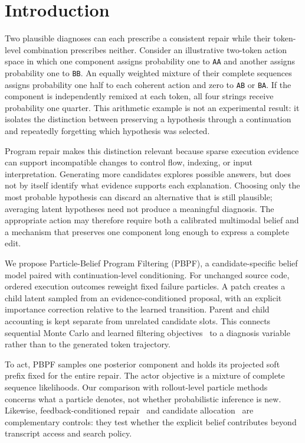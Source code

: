 \section{Introduction}
Two plausible diagnoses can each prescribe a consistent repair while their token-level combination prescribes neither. Consider an illustrative two-token action space in which one component assigns probability one to \texttt{AA} and another assigns probability one to \texttt{BB}. An equally weighted mixture of their complete sequences assigns probability one half to each coherent action and zero to \texttt{AB} or \texttt{BA}. If the component is independently remixed at each token, all four strings receive probability one quarter. This arithmetic example is not an experimental result: it isolates the distinction between preserving a hypothesis through a continuation and repeatedly forgetting which hypothesis was selected.

Program repair makes this distinction relevant because sparse execution evidence can support incompatible changes to control flow, indexing, or input interpretation. Generating more candidates explores possible answers, but does not by itself identify what evidence supports each explanation. Choosing only the most probable hypothesis can discard an alternative that is still plausible; averaging latent hypotheses need not produce a meaningful diagnosis. The appropriate action may therefore require both a calibrated multimodal belief and a mechanism that preserves one component long enough to express a complete edit.

We propose Particle-Belief Program Filtering (PBPF), a candidate-specific belief model paired with continuation-level conditioning. For unchanged source code, ordered execution outcomes reweight fixed failure particles. A patch creates a child latent sampled from an evidence-conditioned proposal, with an explicit importance correction relative to the learned transition. Parent and child accounting is kept separate from unrelated candidate slots. This connects sequential Monte Carlo and learned filtering objectives~\citep{delmoral2006,maddison2017,naesseth2018} to a diagnosis variable rather than to the generated token trajectory.

To act, PBPF samples one posterior component and holds its projected soft prefix fixed for the entire repair. The actor objective is a mixture of complete sequence likelihoods. Our comparison with rollout-level particle methods~\citep{roulette} concerns what a particle denotes, not whether probabilistic inference is new. Likewise, feedback-conditioned repair~\citep{selfdebug} and candidate allocation~\citep{rex} are complementary controls: they test whether the explicit belief contributes beyond transcript access and search policy.

